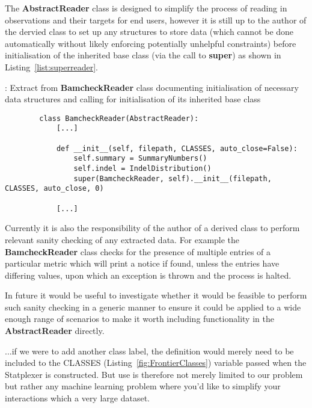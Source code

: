 The \textbf{AbstractReader} class is designed to simplify the process of reading
in observations and their targets for end users, however it is still up to the
author of the dervied class to set up any structures to store data (which cannot
be done automatically without likely enforcing potentially unhelpful
constraints) before initialisation of the inherited base class (via the call to
\textbf{super}) as shown in Listing~\ref{list:superreader}.

\begin{listing}[H]
    \caption[superreader]{: Extract from \textbf{BamcheckReader} class
        documenting initialisation of necessary data structures and calling
        for initialisation of its inherited base class}
    \label{list:superreader}
    \begin{verbatim}
        class BamcheckReader(AbstractReader):
            [...]

            def __init__(self, filepath, CLASSES, auto_close=False):
                self.summary = SummaryNumbers()
                self.indel = IndelDistribution()
                super(BamcheckReader, self).__init__(filepath, CLASSES, auto_close, 0)

            [...]
    \end{verbatim}
\end{listing}

Currently it is also the responsibility of the author of a derived class to
perform relevant sanity checking of any extracted data. For example the
\textbf{BamcheckReader} class checks for the presence of multiple entries of a
particular metric which will print a notice if found, unless the entries have
differing values, upon which an exception is thrown and the process is halted.

In future it would be useful to investigate whether it would be feasible to
perform such sanity checking in a generic manner to ensure it could be applied
to a wide enough range of scenarios to make it worth including functionality in
the \textbf{AbstractReader} directly.




...if we were to add another
class label, the definition would merely need to be included to the CLASSES
(Listing~\ref{fig:FrontierClasses}) variable passed when the Statplexer is
constructed. But use is therefore not merely limited to our problem but rather
any machine learning problem where you'd like to simplify your interactions
which a very large dataset.

